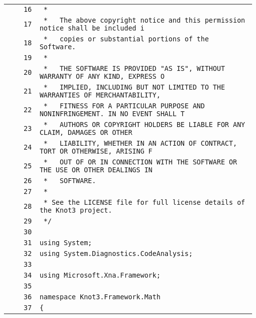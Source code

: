 \documentclass[a4paper,10pt]{article}
\begin{document}
\begin{longtable}[l]{lrrl}
\cellcolor{gray} &  & \verb~16~ & \verb~ *~\\
\cellcolor{gray} &  & \verb~17~ & \verb~ *   The above copyright notice and this permission notice shall be included i~\\
\cellcolor{gray} &  & \verb~18~ & \verb~ *   copies or substantial portions of the Software.~\\
\cellcolor{gray} &  & \verb~19~ & \verb~ *~\\
\cellcolor{gray} &  & \verb~20~ & \verb~ *   THE SOFTWARE IS PROVIDED "AS IS", WITHOUT WARRANTY OF ANY KIND, EXPRESS O~\\
\cellcolor{gray} &  & \verb~21~ & \verb~ *   IMPLIED, INCLUDING BUT NOT LIMITED TO THE WARRANTIES OF MERCHANTABILITY,~\\
\cellcolor{gray} &  & \verb~22~ & \verb~ *   FITNESS FOR A PARTICULAR PURPOSE AND NONINFRINGEMENT. IN NO EVENT SHALL T~\\
\cellcolor{gray} &  & \verb~23~ & \verb~ *   AUTHORS OR COPYRIGHT HOLDERS BE LIABLE FOR ANY CLAIM, DAMAGES OR OTHER~\\
\cellcolor{gray} &  & \verb~24~ & \verb~ *   LIABILITY, WHETHER IN AN ACTION OF CONTRACT, TORT OR OTHERWISE, ARISING F~\\
\cellcolor{gray} &  & \verb~25~ & \verb~ *   OUT OF OR IN CONNECTION WITH THE SOFTWARE OR THE USE OR OTHER DEALINGS IN~\\
\cellcolor{gray} &  & \verb~26~ & \verb~ *   SOFTWARE.~\\
\cellcolor{gray} &  & \verb~27~ & \verb~ *~\\
\cellcolor{gray} &  & \verb~28~ & \verb~ * See the LICENSE file for full license details of the Knot3 project.~\\
\cellcolor{gray} &  & \verb~29~ & \verb~ */~\\
\cellcolor{gray} &  & \verb~30~ & \verb~~\\
\cellcolor{gray} &  & \verb~31~ & \verb~using System;~\\
\cellcolor{gray} &  & \verb~32~ & \verb~using System.Diagnostics.CodeAnalysis;~\\
\cellcolor{gray} &  & \verb~33~ & \verb~~\\
\cellcolor{gray} &  & \verb~34~ & \verb~using Microsoft.Xna.Framework;~\\
\cellcolor{gray} &  & \verb~35~ & \verb~~\\
\cellcolor{gray} &  & \verb~36~ & \verb~namespace Knot3.Framework.Math~\\
\cellcolor{gray} &  & \verb~37~ & \verb~{~\\

\end{longtable}
\end{document}
